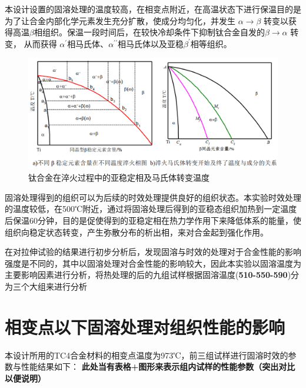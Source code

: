 本设计设置的固溶处理的温度较高，在相变点附近，在高温状态下进行保温目的是为了让合金内部化学元素发生充分扩散，使成分均匀化，并发生 $\alpha\to\beta$ 转变以获得高温$ \beta $相组织。保温一段时间后，在较快冷却条件下抑制钛合金自发的$\beta\to \alpha$ 转变， 从而获得 $ \alpha^{\prime} $相马氏体、$ \alpha^{\prime\prime} $相马氏体以及亚稳$ \beta^{\prime} $相等组织。

\begin{figure}[h!]
	\centering
	\includegraphics[width=0.7\linewidth]{pic/tc4change}
	\caption{钛合金在淬火过程中的亚稳定相及马氏体转变温度}
	\label{fig:tc4change}
\end{figure}

固溶处理得到的组织可以为后续的时效处理提供良好的组织状态。本实验时效处理的温度较低，在500℃附近，通过将固溶处理后得到的亚稳态组织加热到一定温度后保温60分钟，目的是促使得到的亚稳定相在热力学作用下来降低体系的能量，使组织向稳定状态转变，产生弥散分布的析出相，来对合金起到强化作用。

在对拉伸试验的结果进行初步分析后，发现固溶与时效的处理对于合金性能的影响强度是不同的，其中以固溶处理对合金性能的影响较大，因此本实验以固溶温度为主要影响因素进行分析，将热处理的后的九组试样根据固溶温度(\textbf{510-550-590})分为三个大组来进行分析


\section{相变点以下固溶处理对组织性能的影响}
本设计所用的TC4合金材料的相变点温度为973℃，前三组试样进行固溶时效的参数与性能结果如下：
{\color{purple}\bfseries 此处当有表格+图形来表示组内试样的性能参数（突出对比以便说明）}

